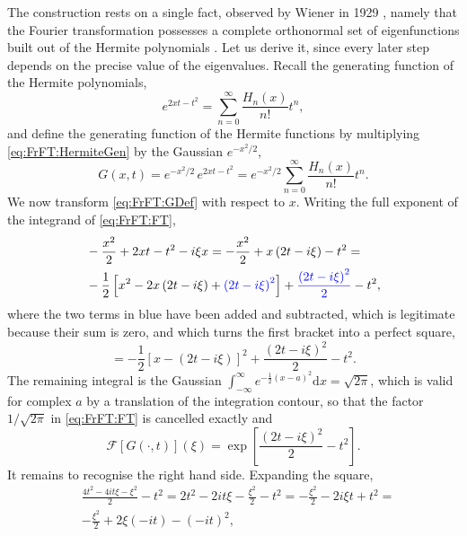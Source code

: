 			The construction rests on a single fact, observed by Wiener in 1929 \citep{wiener1929hermitian}, namely that the Fourier transformation possesses a complete orthonormal set of eigenfunctions built out of the Hermite polynomials \citep{hermite1864nouveau}. Let us derive it, since every later step depends on the precise value of the eigenvalues. Recall the generating function of the Hermite polynomials,
			\begin{equation}\label{eq:FrFT:HermiteGen}
				e^{2xt-t^{2}} = \sum_{n=0}^{\infty}\frac{H_{n}(x)}{n!}t^{n},
			\end{equation}
			and define the generating function of the Hermite functions by multiplying \eqref{eq:FrFT:HermiteGen} by the Gaussian $e^{-x^{2}/2}$,
			\begin{equation}\label{eq:FrFT:GDef}
				G(x,t) = e^{-x^{2}/2}\,e^{2xt-t^{2}} = e^{-x^{2}/2}\sum_{n=0}^{\infty}\frac{H_{n}(x)}{n!}t^{n}.
			\end{equation}
			We now transform \eqref{eq:FrFT:GDef} with respect to $x$. Writing the full exponent of the integrand of \eqref{eq:FrFT:FT},
			\begin{align*}
				& -\frac{x^{2}}{2} + 2xt - t^{2} - i\xi x = -\frac{x^{2}}{2} + x\left(2t-i\xi\right) - t^{2} = \\
				& -\frac{1}{2}\left[x^{2} - 2x\left(2t-i\xi\right) + {\color{blue}\left(2t-i\xi\right)^{2}}\right] + {\color{blue}\frac{\left(2t-i\xi\right)^{2}}{2}} - t^{2},
			\end{align*}
			where the two terms in blue have been added and subtracted, which is legitimate because their sum is zero, and which turns the first bracket into a perfect square,
			\begin{equation*}
				= -\frac{1}{2}\left[x - \left(2t-i\xi\right)\right]^{2} + \frac{\left(2t-i\xi\right)^{2}}{2} - t^{2}.
			\end{equation*}
			The remaining integral is the Gaussian $\int_{-\infty}^{\infty}e^{-\frac{1}{2}(x-a)^{2}}\mathrm{d}x = \sqrt{2\pi}$, which is valid for complex $a$ by a translation of the integration contour, so that the factor $1/\sqrt{2\pi}$ in \eqref{eq:FrFT:FT} is cancelled exactly and
			\begin{equation}\label{eq:FrFT:GTransformed}
				\mathcal{F}\left[G(\cdot,t)\right](\xi) = \exp\left[\frac{\left(2t-i\xi\right)^{2}}{2} - t^{2}\right].
			\end{equation}
			It remains to recognise the right hand side. Expanding the square,
			\begin{align*}
				& \frac{4t^{2} - 4it\xi - \xi^{2}}{2} - t^{2} = 2t^{2} - 2it\xi - \frac{\xi^{2}}{2} - t^{2} = -\frac{\xi^{2}}{2} - 2i\xi t + t^{2} = \\
				& -\frac{\xi^{2}}{2} + 2\xi\left(-it\right) - \left(-it\right)^{2},
			\end{align*}
